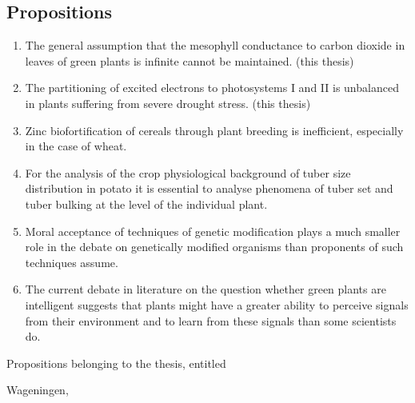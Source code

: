 \documentclass[a5paper, 10pt]{article}
\begin{document}
\subsection*{Propositions}

\begin{enumerate}[wide]
    \item The general assumption that the mesophyll conductance to carbon dioxide in leaves of
green plants is infinite cannot be maintained.
(this thesis)
    \item The partitioning of excited electrons to photosystems I and II is unbalanced in plants
suffering from severe drought stress.
(this thesis)
    \item Zinc biofortification of cereals through plant breeding is inefficient, especially in the
case of wheat.
    \item For the analysis of the crop physiological background of tuber size distribution in
potato it is essential to analyse phenomena of tuber set and tuber bulking at the level
of the individual plant.
    \item Moral acceptance of techniques of genetic modification plays a much smaller role in
the debate on genetically modified organisms than proponents of such techniques
assume.
    \item The current debate in literature on the question whether green plants are intelligent
suggests that plants might have a greater ability to perceive signals from their
environment and to learn from these signals than some scientists do. 
\end{enumerate}

\vspace*{\fill}

Propositions belonging to the thesis, entitled

\vskip 2mm

\thetitle{}

\vskip 2mm

\theauthor{}

Wageningen, 
\end{document}
